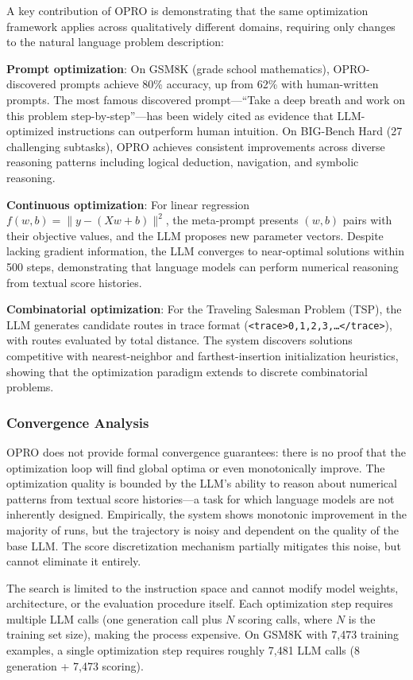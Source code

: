 A key contribution of OPRO is demonstrating that the same optimization framework applies across qualitatively different domains, requiring only changes to the natural language problem description:

\textbf{Prompt optimization}: On GSM8K (grade school mathematics), OPRO-discovered prompts achieve 80\% accuracy, up from 62\% with human-written prompts. The most famous discovered prompt---``Take a deep breath and work on this problem step-by-step''---has been widely cited as evidence that LLM-optimized instructions can outperform human intuition. On BIG-Bench Hard (27 challenging subtasks), OPRO achieves consistent improvements across diverse reasoning patterns including logical deduction, navigation, and symbolic reasoning.

\textbf{Continuous optimization}: For linear regression $f(w,b) = \|y - (Xw + b)\|^2$, the meta-prompt presents $(w, b)$ pairs with their objective values, and the LLM proposes new parameter vectors. Despite lacking gradient information, the LLM converges to near-optimal solutions within 500 steps, demonstrating that language models can perform numerical reasoning from textual score histories.

\textbf{Combinatorial optimization}: For the Traveling Salesman Problem (TSP), the LLM generates candidate routes in trace format (\texttt{<trace>0,1,2,3,\ldots</trace>}), with routes evaluated by total distance. The system discovers solutions competitive with nearest-neighbor and farthest-insertion initialization heuristics, showing that the optimization paradigm extends to discrete combinatorial problems.

\subsubsection{Convergence Analysis}

OPRO does not provide formal convergence guarantees: there is no proof that the optimization loop will find global optima or even monotonically improve. The optimization quality is bounded by the LLM's ability to reason about numerical patterns from textual score histories---a task for which language models are not inherently designed. Empirically, the system shows monotonic improvement in the majority of runs, but the trajectory is noisy and dependent on the quality of the base LLM. The score discretization mechanism partially mitigates this noise, but cannot eliminate it entirely.

The search is limited to the instruction space and cannot modify model weights, architecture, or the evaluation procedure itself. Each optimization step requires multiple LLM calls (one generation call plus $N$ scoring calls, where $N$ is the training set size), making the process expensive. On GSM8K with 7,473 training examples, a single optimization step requires roughly 7,481 LLM calls (8 generation + 7,473 scoring).

